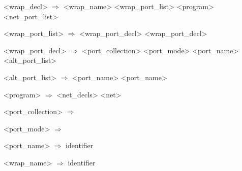 \setlength{\grammarindent}{9.6em} %
\begin{grammar}
    <wrap\_decl> $\Rightarrow$  <wrap\_name> \lit{(} <wrap\_port\_list> \lit{)} \lit{\{} <program> \lit{\}} \newline
     \lit{(} <net\_port\_list> \lit{)}

    <wrap\_port\_list> $\Rightarrow$ <wrap\_port\_decl> \Regex{[} \lit{,} <wrap\_port\_decl> \Regex{]*}

    <wrap\_port\_decl> $\Rightarrow$ \Regex{[} <port\_collection> \Regex{]} <port\_mode> <port\_name> \newline
    \Regex{[} \lit{(} <alt\_port\_list> \lit{)} \Regex{]}

    <alt\_port\_list> $\Rightarrow$ <port\_name> \Regex{[} \lit{,} <port\_name> \Regex{]*}

    <program> $\Rightarrow$ <net\_decls>  <net>

    <port\_collection> $\Rightarrow$ 
    \alt {}
    \alt {}

    <port\_mode> $\Rightarrow$ 
    \alt {}

    <port\_name> $\Rightarrow$ identifier

    <wrap\_name> $\Rightarrow$ identifier
\end{grammar}

